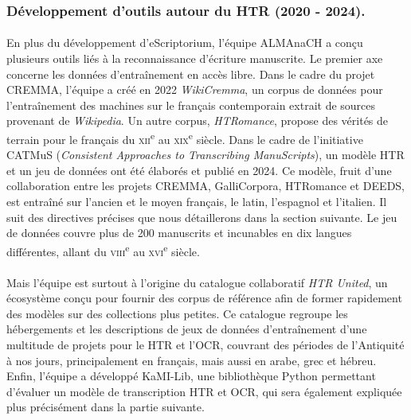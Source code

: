 \documentclass[a4paper,12pt,twoside]{book}
\begin{document}
	\subsubsection{Développement d'outils autour du HTR (2020 - 2024).}

\paragraph{}
En plus du développement d’eScriptorium, l’équipe ALMAnaCH a conçu plusieurs outils liés à la reconnaissance d’écriture manuscrite. Le premier axe concerne les données d’entraînement en accès libre. Dans le cadre du projet CREMMA, l’équipe a créé en 2022 \textit{WikiCremma}, un corpus de données pour l’entraînement des machines sur le français contemporain extrait de sources provenant de \textit{Wikipedia}. Un autre corpus, \textit{HTRomance}, propose des vérités de terrain pour le français du \textsc{xii}\textsuperscript{e} au \textsc{xix}\textsuperscript{e} siècle. Dans le cadre de l’initiative CATMuS (\textit{Consistent Approaches to Transcribing ManuScripts}), un modèle HTR et un jeu de données ont été élaborés et publié en 2024. Ce modèle, fruit d’une collaboration entre les projets CREMMA, GalliCorpora, HTRomance et DEEDS, est entraîné sur l’ancien et le moyen français, le latin, l’espagnol et l’italien. Il suit des directives précises que nous détaillerons dans la section suivante. Le jeu de données couvre plus de 200 manuscrits et incunables en dix langues différentes, allant du \textsc{viii}\textsuperscript{e} au \textsc{xvi}\textsuperscript{e} siècle.

\paragraph{}
Mais l'équipe est surtout à l’origine du catalogue collaboratif \textit{HTR United}, un écosystème conçu pour fournir des corpus de référence afin de former rapidement des modèles sur des collections plus petites. Ce catalogue regroupe les hébergements et les descriptions de jeux de données d'entraînement d'une multitude de projets pour le HTR et l’OCR, couvrant des périodes de l’Antiquité à nos jours, principalement en français, mais aussi en arabe, grec et hébreu. Enfin, l’équipe a développé KaMI-Lib, une bibliothèque Python permettant d’évaluer un modèle de transcription HTR et OCR, qui sera également expliquée plus précisément dans la partie suivante.
\end{document}
